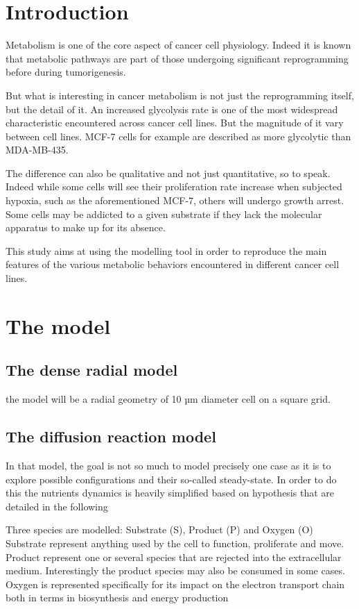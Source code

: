 \documentclass[11pt,a4paper]{article}
\begin{document}
\section{Introduction}
Metabolism is one of the core aspect of cancer cell physiology. Indeed it is known that metabolic pathways are part of those undergoing significant reprogramming before during tumorigenesis.

But what is interesting in cancer metabolism is not just the reprogramming itself, but the detail of it. An increased glycolysis rate is one of the most widespread characteristic encountered across cancer cell lines. But the magnitude of it vary between cell lines. MCF-7 cells for example are described as more glycolytic than MDA-MB-435.\cite{Mazurek1997}

The difference can also be qualitative and not just quantitative, so to speak. Indeed while some cells will see their proliferation rate increase when subjected hypoxia, such as the aforementioned MCF-7\cite{Bayar2021}, others will undergo growth arrest.\cite{Waker2018} Some cells may be addicted to a given substrate if they lack the molecular apparatus to make up for its absence.\cite{Jiang2016}

This study aims at using the modelling tool in order to reproduce the main features of the various metabolic behaviors encountered in different cancer cell lines.


\section{The model}
\subsection{The dense radial model}
the model will be a radial geometry of 10 µm diameter cell on a square grid.

\subsection{The diffusion reaction model}
In that model, the goal is not so much to model precisely one case as it is to explore possible configurations and their so-called steady-state. In order to do this the nutrients dynamics is heavily simplified based on hypothesis that are detailed in the following

Three species are modelled: Substrate (S),  Product (P) and Oxygen (O)
Substrate represent anything used by the cell to function, proliferate and move. Product represent one or several species that are rejected into the extracellular medium. Interestingly the product species may also be consumed in some cases. Oxygen is represented specifically for its impact on the electron transport chain both in terms in biosynthesis and energy production 
\end{document}
